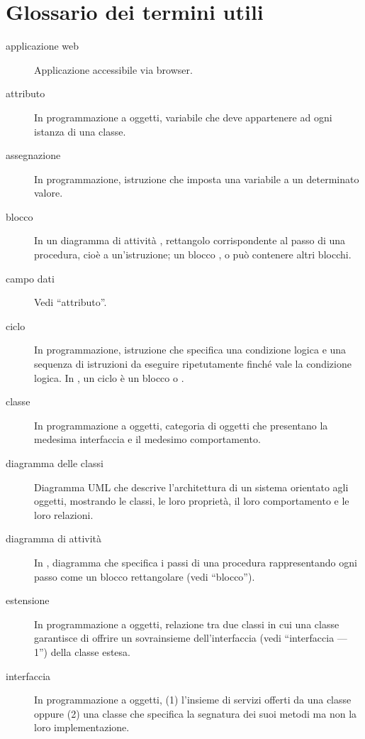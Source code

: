 \appendix


\section{Glossario dei termini utili} \label{app:gloss}

\begin{description}
	\item[applicazione web] Applicazione accessibile via browser.
	\item[attributo] In programmazione a oggetti, variabile che deve appartenere ad ogni istanza di una classe.
	\item[assegnazione] In programmazione, istruzione che imposta una variabile a un determinato valore.
	\item[blocco] In un diagramma di attività \proj, rettangolo corrispondente al passo di una procedura, cioè a un'istruzione; un blocco ,  o  può contenere altri blocchi.
	\item[campo dati] Vedi “attributo”.
	\item[ciclo] In programmazione, istruzione che specifica una condizione logica e una sequenza di istruzioni da eseguire ripetutamente finché vale la condizione logica. In \proj, un ciclo è un blocco  o .
	\item[classe] In programmazione a oggetti, categoria di oggetti che presentano la medesima interfaccia e il medesimo comportamento.
	\item[diagramma delle classi] Diagramma UML che descrive l'architettura di un sistema orientato agli oggetti, mostrando le classi, le loro proprietà, il loro comportamento e le loro relazioni.
	\item[diagramma di attività] In \proj, diagramma che specifica i passi di una procedura rappresentando ogni passo come un blocco rettangolare (vedi “blocco”).
	\item[estensione] In programmazione a oggetti, relazione tra due classi in cui una classe garantisce di offrire un sovrainsieme dell'interfaccia (vedi “interfaccia --- 1”) della classe estesa.
	\item[interfaccia] In programmazione a oggetti, (1) l'insieme di servizi offerti da una classe oppure (2) una classe che specifica la segnatura dei suoi metodi ma non la loro implementazione.

\end{description}
